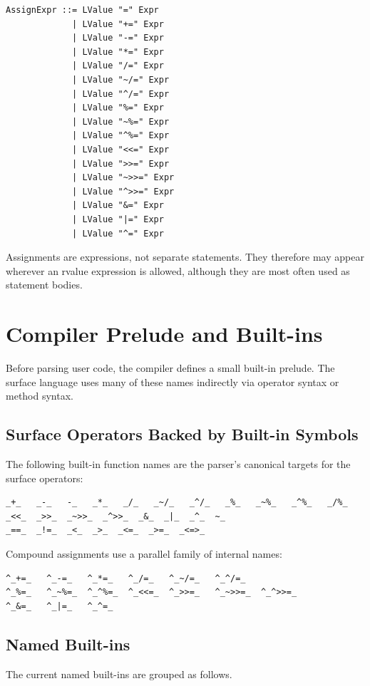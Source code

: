 \documentclass[12pt,oneside]{article}
\begin{document}
\begin{verbatim}
AssignExpr ::= LValue "=" Expr
             | LValue "+=" Expr
             | LValue "-=" Expr
             | LValue "*=" Expr
             | LValue "/=" Expr
             | LValue "~/=" Expr
             | LValue "^/=" Expr
             | LValue "%=" Expr
             | LValue "~%=" Expr
             | LValue "^%=" Expr
             | LValue "<<=" Expr
             | LValue ">>=" Expr
             | LValue "~>>=" Expr
             | LValue "^>>=" Expr
             | LValue "&=" Expr
             | LValue "|=" Expr
             | LValue "^=" Expr
\end{verbatim}

Assignments are expressions, not separate statements. They therefore may appear
wherever an rvalue expression is allowed, although they are most often used as
statement bodies.

\section{Compiler Prelude and Built-ins}
\label{sec:builtins}
Before parsing user code, the compiler defines a small built-in prelude. The
surface language uses many of these names indirectly via operator syntax or
method syntax.

\subsection{Surface Operators Backed by Built-in Symbols}
The following built-in function names are the parser's canonical targets for the
surface operators:

\begin{verbatim}
_+_   _-_   -_   _*_   _/_   _~/_   _^/_   _%_   _~%_   _^%_   _/%_
_<<_  _>>_  _~>>_  _^>>_  _&_  _|_  _^_  ~_
_==_  _!=_  _<_  _>_  _<=_  _>=_  _<=>_
\end{verbatim}

Compound assignments use a parallel family of internal names:

\begin{verbatim}
^_+=_   ^_-=_   ^_*=_   ^_/=_   ^_~/=_   ^_^/=_
^_%=_   ^_~%=_  ^_^%=_  ^_<<=_  ^_>>=_   ^_~>>=_  ^_^>>=_
^_&=_   ^_|=_   ^_^=_
\end{verbatim}

\subsection{Named Built-ins}
The current named built-ins are grouped as follows.
\end{document}

